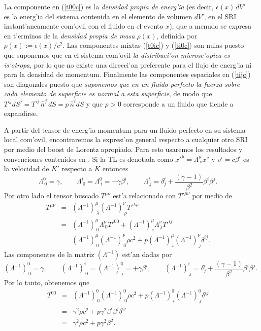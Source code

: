 La componente en (\ref{t00c}) es la \textit{densidad propia de energ'ia} (es decir, $\epsilon(x)\,dV'$ es la energ'ia del sistema contenida en el elemento de volumen $dV'$, en el SRI instant'aneamente com'ovil con el fluido en el evento $x$), que a menudo se expresa en t'erminos de la \textit{densidad propia de masa} $\rho(x)$, definida por $\rho(x):=\epsilon(x)/c^2$. Las componentes
mixtas (\ref{t0ic}) y (\ref{ti0c}) son nulas puesto que suponemos que en el sistema com'ovil \textit{la distribuci'on microsc'opica es is'otropa}, por lo que no existe una direcci'on preferente para el flujo de energ'ia ni para la densidad de momentum. Finalmente las componentes espaciales
en (\ref{tijc}) son diagonales puesto que \textit{suponemos que en un fluido
perfecto la fuerza sobre cada elemento de superficie es normal a esta
superficie}, de modo que $T^{ij}dS^j=T^{ij}\,\hat{n}^j\,dS=p\,\hat{n}^i dS$ y que $p>0$ corresponde a un fluido que tiende a expandirse.

A partir del tensor de energ'ia-momentum para un fluido perfecto en su sistema local com'ovil, encontraremos la expresi'on general respecto a cualquier
otro SRI por medio del boost de Lorentz apropiado. Para esto usaremos los resultados y convenciones contenidos en \cite{7}. Si la TL es denotada como $x'^\mu=\Lambda^\mu_{\ \nu}x^\nu$ y $v^i=c\beta^i$ es la velocidad de $K'$ respecto a $K$ entonces
\begin{equation}
 \Lambda^0_{\ 0}=\gamma, \qquad \Lambda^i_{\ 0}=\Lambda^0_{\ i}=-\gamma\beta^i, \qquad \Lambda^i_{\ j}=\delta^i_j
+\frac{(\gamma-1) }{\beta^2}\beta^i\beta^j .
\end{equation}
Por otro lado el tensor buscado $T^{\mu\nu}$ est'a relacionado con $T'^{\mu\nu}$ por medio de
\begin{eqnarray}
T^{\mu\nu}&=&(\Lambda^{-1})^\mu_{\ \lambda}(\Lambda^{-1})^\nu_{\ \rho}T'^{\lambda\rho}
\\
&=& (\Lambda^{-1})^\mu_{\ 0}\Lambda^\nu_{\ 0}T'^{00}+(\Lambda^{-1})^\mu_{\
i}\Lambda^\nu_{\ j}T'^{ij}\\
&=& (\Lambda^{-1})^\mu_{\ 0}(\Lambda^{-1})^\nu_{\ 0}\rho c^2+p(\Lambda^{-1})^\mu_{\
i}(\Lambda^{-1})^\nu_{\ j}\delta^{ij}.
\end{eqnarray}
Las componentes de la matriz $(\Lambda^{-1})$ est'an dadas por
\begin{equation}
(\Lambda^{-1})^0_{\ 0}=\gamma, \qquad (\Lambda^{-1})^i_{\ 0}=(\Lambda^{-1})^0_{\ i}=+\gamma\beta^i, \qquad (\Lambda^{-1})^i_{\ j}=\delta^i_j
+\frac{(\gamma-1) }{\beta^2}\beta^i\beta^j .
\end{equation}
Por lo tanto, obtenemos que
\begin{eqnarray}
T^{00}&=& (\Lambda^{-1})^0_{\ 0}(\Lambda^{-1})^0_{\ 0}\rho c^2+p(\Lambda^{-1})^0_{\ i}(\Lambda^{-1})^0_{\ j}\delta^{ij} \\
&=& \gamma^2\rho c^2+p\gamma^2\beta^i\beta^j\delta^{ij} \\
&=& \gamma^2\rho c^2+p\gamma^2\beta^2 .
\end{eqnarray}

